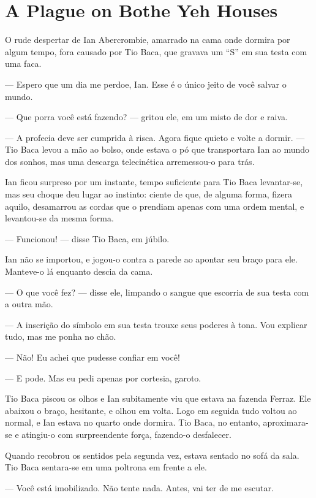 \chapter{\foreignlanguage{english}{A Plague on Bothe Yeh Houses}}

O rude despertar de Ian Abercrombie, amarrado na cama onde dormira por
algum tempo, fora causado por Tio Baca, que gravava um “S” em sua testa
com uma faca.

--- Espero que um dia me perdoe, Ian. Esse é o único jeito de você
salvar o mundo.

--- Que porra você está fazendo? --- gritou ele, em um misto de dor e
raiva.

--- A profecia deve ser cumprida à risca. Agora fique quieto e volte a
dormir. --- Tio Baca levou a mão ao bolso, onde estava o pó que
transportara Ian ao mundo dos sonhos, mas uma descarga telecinética
arremessou-o para trás.

Ian ficou surpreso por um instante, tempo suficiente para Tio Baca
levantar-se, mas seu choque deu lugar ao instinto: ciente de que, de
alguma forma, fizera aquilo, desamarrou as cordas que o prendiam apenas
com uma ordem mental, e levantou-se da mesma forma.

--- Funcionou! --- disse Tio Baca, em júbilo.

Ian não se importou, e jogou-o contra a parede ao apontar seu braço para
ele. Manteve-o lá enquanto descia da cama.

--- O que você fez? --- disse ele, limpando o sangue que escorria de sua
testa com a outra mão.

--- A inscrição do símbolo em sua testa trouxe seus poderes à tona. Vou
explicar tudo, mas me ponha no chão.

--- Não! Eu achei que pudesse confiar em você!

--- E pode. Mas eu pedi apenas por cortesia, garoto.

Tio Baca piscou os olhos e Ian subitamente viu que estava na fazenda
Ferraz. Ele abaixou o braço, hesitante, e olhou em volta. Logo em
seguida tudo voltou ao normal, e Ian estava no quarto onde dormira. Tio
Baca, no entanto, aproximara-se e atingiu-o com surpreendente força,
fazendo-o desfalecer.

Quando recobrou os sentidos pela segunda vez, estava sentado no sofá da
sala. Tio Baca sentara-se em uma poltrona em frente a ele.

--- Você está imobilizado. Não tente nada. Antes, vai ter de me escutar.

